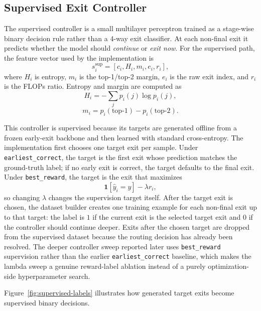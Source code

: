 \documentclass[10pt,twocolumn]{article}
\begin{document}
\subsection{Supervised Exit Controller}

The supervised controller is a small multilayer perceptron trained as a stage-wise binary decision rule rather than a 4-way exit classifier. At each non-final exit it predicts whether the model should \emph{continue} or \emph{exit now}. For the supervised path, the feature vector used by the implementation is
\begin{equation}
    s_i^{\text{sup}} = [c_i, H_i, m_i, e_i, r_i],
\end{equation}
where $H_i$ is entropy, $m_i$ is the top-1/top-2 margin, $e_i$ is the raw exit index, and $r_i$ is the FLOPs ratio. Entropy and margin are computed as
\begin{equation}
    H_i = -\sum_j p_i(j)\log p_i(j),
\end{equation}
\begin{equation}
    m_i = p_i(\text{top-1}) - p_i(\text{top-2}).
\end{equation}

This controller is supervised because its targets are generated offline from a frozen early-exit backbone and then learned with standard cross-entropy. The implementation first chooses one target exit per sample. Under \texttt{earliest\_correct}, the target is the first exit whose prediction matches the ground-truth label; if no early exit is correct, the target defaults to the final exit. Under \texttt{best\_reward}, the target is the exit that maximizes
\begin{equation}
    \mathbf{1}[\hat{y}_i = y] - \lambda r_i,
\end{equation}
so changing $\lambda$ changes the supervision target itself. After the target exit is chosen, the dataset builder creates one training example for each non-final exit up to that target: the label is $1$ if the current exit is the selected target exit and $0$ if the controller should continue deeper. Exits after the chosen target are dropped from the supervised dataset because the routing decision has already been resolved. The deeper controller sweep reported later uses \texttt{best\_reward} supervision rather than the earlier \texttt{earliest\_correct} baseline, which makes the lambda sweep a genuine reward-label ablation instead of a purely optimization-side hyperparameter search.

Figure~\ref{fig:supervised-labels} illustrates how generated target exits become supervised binary decisions.
\end{document}
